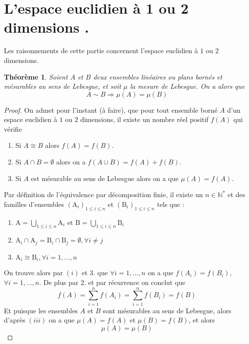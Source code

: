\section{L'espace euclidien à 1 ou 2 dimensions .}
\newtheorem{defff}{Définition}
\newtheorem{TTT}{Théorème}
\newtheorem{Coo}{Corollaire}
\newtheorem{PRR}{Proposition}
\newtheorem{rr}{Remarque}
\newtheorem{lm}{Lemme}
\noindent
Les raisonnements de cette partie concernent l'espace euclidien à $1$ ou $2$ dimensions.

\begin{TTT}
  Soient $A$ et $B$ deux ensembles linéaires ou plans bornés et mésurables au sens de Lebesgue, et soit $\mu$ la mesure de Lebesgue. On a alors que
  $$A \sim B \Rightarrow \mu(A) = \mu(B)$$
\end{TTT}
\begin{proof}
  On admet pour l'instant (à faire), que pour tout ensemble borné $A$ d'un espace euclidien à $1$ ou $2$ dimensions, il existe un nombre réel positif $f(A)$ qui vérifie
  \begin{enumerate}[label=(\roman*)]
    \item Si $A \cong B$ alors $f(A) = f(B)$.
    \item Si $A \cap B = \emptyset$ alors on a $f(A\cup B) = f(A)+f(B)$.
    \item Si $A$ est mésurable au sens de Lebesgue alors on a que $\mu(A) = f(A)$.
  \end{enumerate}
  Par définition de l'équivalence par décomposition finie, il existe un $n \in \mathbb{N}^*$ et des familles d'ensembles $\left(\mathrm{A}_i\right)_{1\le i \le n}$ et $\left(\mathrm{B}_i\right)_{1\le i \le n}$ tels que :
  \begin{center}
  \begin{enumerate}
    \item $\mathrm{A} = \underset{1\le i \le n}{\bigcup}\mathrm{A}_i \text{ et } \mathrm{B} = \underset{1\le i \le n}{\bigcup}\mathrm{B}_i$
    \item $\mathrm{A}_i \cap \mathrm{A}_j = \mathrm{B}_i \cap \mathrm{B}_j = \emptyset, \forall i\neq j$
    \item $\mathrm{A}_i \cong \mathrm{B}_i, \forall i=1, ...,n$
  \end{enumerate}
\end{center}
On trouve alors par $(i)$ et $3.$ que $\forall i=1,...,n$ on a que $f(A_i) = f(B_i)$, $\forall i=1,...,n$. De plus par $2.$ et par récurrence on conclut que $$f(A) = \sum_{i=1}^n f(A_i) = \sum_{i=1}^n f(B_i) = f(B)$$
Et puisque les ensembles $A$ et $B$ sont mésurables au sens de Lebesgue, alors d'après $(iii)$ on a que $\mu(A) = f(A)$ et $\mu(B) = f(B)$, et alors $$\mu(A) = \mu(B)$$
\end{proof}
